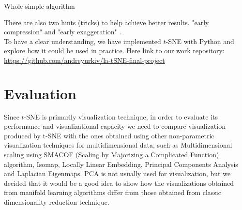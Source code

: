 \begin{algorithm}[H] %
\caption{Whole simple algorithm \cite{tsnearticle}}
\SetAlgoLined
{}
\end{algorithm}

There are also two hints (tricks) to help achieve better results. "early compression" and "early exaggeration" \cite{tsnearticle}.\\

To have a clear understanding, we have implemented $t$-SNE with Python and explore how it could be used in practice. Here link to our work repository:\\

\url{https://github.com/andreyurkiv/la-tSNE-final-project}

\section{Evaluation}

Since $t$-SNE is primarily visualization technique, in order to evaluate its performance and visualizational capacity we need to compare visualization produced by t-SNE with the ones obtained using other non-parametric visualization techniques for multidimensional data, such as Multidimensional scaling using SMACOF (Scaling by Majorizing a Complicated Function) algorithm, Isomap, Locally Linear Embedding, Principal Components Analysis and Laplacian Eigenmaps. PCA is not usually used for visualization, but we decided that it would be a good idea to show how the visualizations obtained from manifold learning algorithms differ from those obtained from classic dimensionality reduction technique.\\

